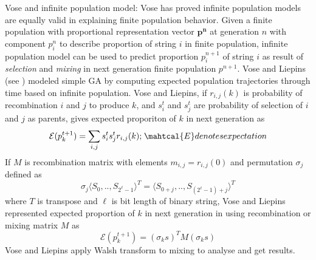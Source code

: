 Vose and infinite population model:
Vose has proved infinite population models are equally valid in explaining finite population behavior. 
Given a finite population with proportional representation vector $\bm{p^n}$ at generation $n$ with 
component $p_i^n$ to describe proportion of string $i$ in finite population, infinite population model 
can be used to predict proportion $p_i^{n+1}$ of string $i$ as result of \textit{selection} and 
\textit{mixing} in next generation finite population $p^{n+1}$. Vose and Liepins (see \cite{VoseLiepins1991}) 
modeled simple GA by computing expected population trajectories through time based on infinite population. 
Vose and Liepins, if $r_{i,j}(k)$ is probability of recombination $i$ and $j$ to produce $k$, and $s_i^t$ and $s_j^t$ 
are probability of selection of $i$ and $j$ as parents, gives expected proporiton of $k$ in next generation as
\[
\mathcal{E}(p_k^{t+1}) = \sum_{i,j} s_i^t s_j^t r_{i,j}(k) ; \hspace{1pt} \mahtcal{E} denotes expectation
\]
If $M$ is recombination matrix with elements $m_{i,j} = r_{i,j}(0)$ and permutation $\sigma_j$ defined as 
\[
\sigma_j{\langle S_0,..,S_{2^\ell - 1} \rangle}^{T} = {\langle S_{0+j},..,S_{(2^\ell - 1)+j} \rangle}^{T}
\]
where $T$ is transpose and $\ell$ is bit length of binary string, Vose and Liepins represented expected proportion 
of $k$ in next generation in using recombination or mixing matrix $M$ as
\[
\mathcal{E}(p_k^{t+1}) = (\sigma_k s)^T M (\sigma_k s)
\]
Vose and Liepins apply Walsh transform to mixing to analyse and get results. 

